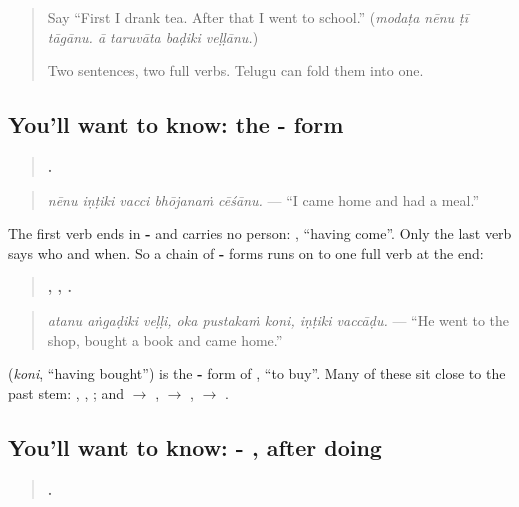 \label{lesson:TE-C317-vacci}



\begin{quote}
Say \textquotedblleft{}First I drank tea. After that I went to school.\textquotedblright{} (\emph{modaṭa nēnu ṭī tāgānu. ā taruvāta baḍiki veḷḷānu.})

Two sentences, two full verbs. Telugu can fold them into one.
\end{quote}

\subsection*{You'll want to know: the - form}
\begin{quote}
\textbf{    .}
\end{quote}

\begin{quote}
\emph{nēnu iṇṭiki vacci bhōjanaṁ cēśānu.} — \textquotedblleft{}I came home and had a meal.\textquotedblright{}
\end{quote}

The first verb ends in \textbf{-} and carries no person: \textbf{}, \textquotedblleft{}having come\textquotedblright{}. Only the last verb says who and when. So a chain of \textbf{-} forms runs on to one full verb at the end:

\begin{quote}
\textbf{  ,   ,  .}
\end{quote}

\begin{quote}
\emph{atanu aṅgaḍiki veḷḷi, oka pustakaṁ koni, iṇṭiki vaccāḍu.} — \textquotedblleft{}He went to the shop, bought a book and came home.\textquotedblright{}
\end{quote}

\textbf{} (\emph{koni}, \textquotedblleft{}having bought\textquotedblright{}) is the \textbf{-} form of \textbf{}, \textquotedblleft{}to buy\textquotedblright{}. Many of these sit close to the past stem: \textbf{}, \textbf{}, \textbf{}; and \textbf{} $\to$ \textbf{}, \textbf{} $\to$ \textbf{}, \textbf{} $\to$ \textbf{}.

\subsection*{You'll want to know: - , after doing}
\begin{quote}
\textbf{    .}
\end{quote}

